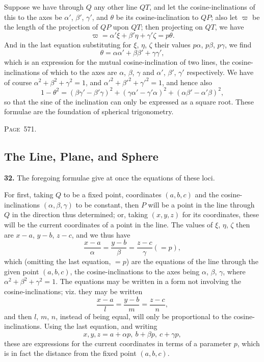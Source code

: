 \documentclass[11pt,a4paper]{article}
\theoremstyle{definition}
\begin{document}
Suppose we have through $Q$ any other line $QT$, and let the cosine-inclinations of this to the axes be $\alpha'$, $\beta'$, $\gamma'$, and $\theta$ be its cosine-inclination to $QP$; also let $\varpi$ be the length of the projection of $QP$ upon $QT$; then projecting on $QT$, we have
\[
\varpi = \alpha'\xi + \beta'\eta + \gamma'\zeta = p\theta.
\]
And in the last equation substituting for $\xi$, $\eta$, $\zeta$ their values $p\alpha$, $p\beta$, $p\gamma$, we find
\[
\theta = \alpha\alpha' + \beta\beta' + \gamma\gamma',
\]
which is an expression for the mutual cosine-inclination of two lines, the cosine-inclinations of which to the axes are $\alpha$, $\beta$, $\gamma$ and $\alpha'$, $\beta'$, $\gamma'$ respectively. We have of course $\alpha^2+\beta^2+\gamma^2=1$, and $\alpha'^2+\beta'^2+\gamma'^2=1$, and hence also
\[
1-\theta^2 = (\beta\gamma'-\beta'\gamma)^2 + (\gamma\alpha'-\gamma'\alpha)^2 + (\alpha\beta'-\alpha'\beta)^2,
\]
so that the sine of the inclination can only be expressed as a square root. These formulae are the foundation of spherical trigonometry.

\newpage
\noindent\textsc{Page~571.} \subsection*{The Line, Plane, and Sphere}

\textbf{32.} The foregoing formulae give at once the equations of these loci.

For first, taking $Q$ to be a fixed point, coordinates $(a,b,c)$ and the cosine-inclinations $(\alpha,\beta,\gamma)$ to be constant, then $P$ will be a point in the line through $Q$ in the direction thus determined; or, taking $(x,y,z)$ for its coordinates, these will be the current coordinates of a point in the line. The values of $\xi$, $\eta$, $\zeta$ then are $x-a$, $y-b$, $z-c$, and we thus have
\[
\frac{x-a}{\alpha} = \frac{y-b}{\beta} = \frac{z-c}{\gamma} (= p),
\]
which (omitting the last equation, $=p$) are the equations of the line through the given point $(a,b,c)$, the cosine-inclinations to the axes being $\alpha$, $\beta$, $\gamma$, where $\alpha^2+\beta^2+\gamma^2=1$. The equations may be written in a form not involving the cosine-inclinations; viz. they may be written
\[
\frac{x-a}{l} = \frac{y-b}{m} = \frac{z-c}{n},
\]
and then $l$, $m$, $n$, instead of being equal, will only be proportional to the cosine-inclinations. Using the last equation, and writing
\[
x, y, z = a+\alpha p,\ b+\beta p,\ c+\gamma p,
\]
these are expressions for the current coordinates in terms of a parameter $p$, which is in fact the distance from the fixed point $(a,b,c)$.
\end{document}
